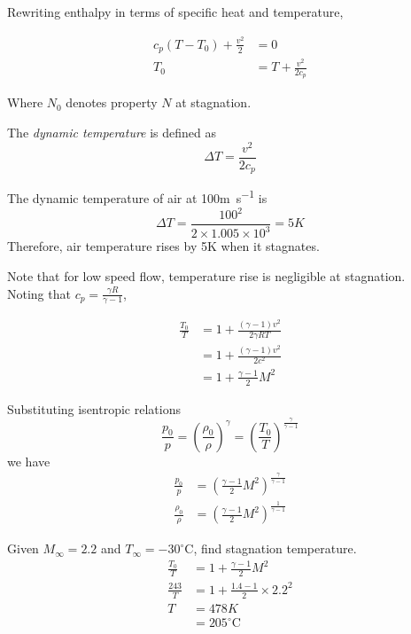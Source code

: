 \documentclass[12pt]{article}
\begin{document}
Rewriting enthalpy in terms of specific heat and temperature,

\begin{align*}
	c_p(T-T_0) + \frac{v^2}{2} &= 0 \\
	T_0 &= T + \frac{v^2}{2c_p}
\end{align*}

Where $N_0$ denotes property $N$ at stagnation.

\begin{defn}
	The \emph{dynamic temperature} is defined as
	$$\Delta T = \frac{v^2}{2c_p}$$
\end{defn}

\begin{ex}
	The dynamic temperature of air at 100\unit{m.s^{-1}} is
	$$\Delta T = \frac{100^2}{2 \times 1.005\times10^3} = 5\unit{K}$$
	Therefore, air temperature rises by 5\unit{K} when it stagnates.
\end{ex}

Note that for low speed flow, temperature rise is negligible at stagnation. \\
Noting that $c_p = \frac{\gamma R}{\gamma-1}$,

\begin{align*}
	\frac{T_0}{T} &= 1 + \frac{(\gamma-1)v^2}{2\gamma RT} \\
		      &= 1 + \frac{(\gamma-1)v^2}{2c^2} \\
		      &= 1 + \frac{\gamma-1}{2}M^2
\end{align*}

Substituting isentropic relations
$$\frac{p_0}{p} = \left(\frac{\rho_0}{\rho}\right)^\gamma = \left(\frac{T_0}{T}\right)^{\frac{\gamma}{\gamma-1}}$$
we have
\begin{align*}
	\frac{p_0}{p} &= \left(\frac{\gamma-1}{2}M^2\right)^{\frac{\gamma}{\gamma-1}} \\
	\frac{\rho_0}{\rho} &= \left(\frac{\gamma-1}{2}M^2\right)^{\frac{1}{\gamma-1}}
\end{align*}

\begin{ex}
	Given $M_\infty = 2.2$ and $T_\infty = -30^\circ$C, find stagnation temperature.
	\begin{align*}
		\frac{T_0}{T} &= 1 + \frac{\gamma-1}{2}M^2 \\
		\frac{243}{T} &= 1 + \frac{1.4-1}{2}\times2.2^2 \\
		T &= 478\unit{K} \\
		  &= 205^\circ\text{C}
	\end{align*}
\end{ex}
\end{document}
